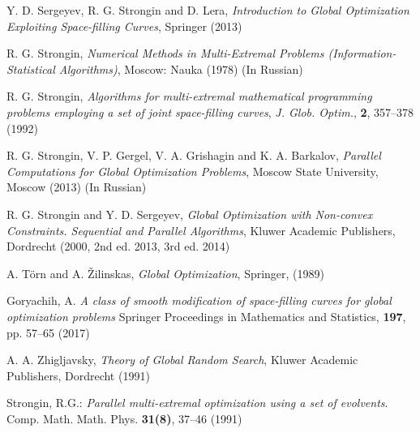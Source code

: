 \documentclass[runningheads]{llncs}
\begin{document}
%
%
% 
% 
%
\begin{thebibliography}{107}

\newblock Y. D. Sergeyev, R. G. Strongin and D. Lera,
\newblock \emph{Introduction to Global Optimization Exploiting Space-filling Curves},
\newblock Springer (2013)

\newblock R. G. Strongin,
\newblock \emph{Numerical Methods in Multi-Extremal Problems (Information-Statistical Algorithms)},
\newblock Moscow: Nauka (1978) (In Russian)

\newblock R. G. Strongin,
\newblock \emph{\emph{Algorithms for multi-extremal mathematical programming problems
employing a set of joint space-filling curves}},
\newblock \emph{J. Glob. Optim.}, \textbf{2}, 357--378 (1992)

\newblock R. G. Strongin, V. P. Gergel, V. A. Grishagin and K. A. Barkalov,
\newblock \emph{Parallel Computations for Global Optimization Problems},
\newblock Moscow State University, Moscow (2013) (In Russian)

\newblock R. G. Strongin and Y. D. Sergeyev,
\newblock \emph{Global Optimization with Non-convex Constraints. Sequential and Parallel
Algorithms},
\newblock Kluwer Academic Publishers, Dordrecht (2000, 2nd ed. 2013, 3rd ed. 2014)

\newblock A. T\"orn and A. \v Zilinskas,
\newblock \emph{Global Optimization},
\newblock Springer, (1989)

\newblock Goryachih, A.
\newblock \emph{A class of smooth modification of space-filling curves for global optimization
problems}
\newblock Springer Proceedings in Mathematics and Statistics, \textbf{197}, pp. 57--65 (2017)

\newblock A. A. Zhigljavsky,
\newblock \emph{Theory of Global Random Search},
\newblock Kluwer Academic Publishers, Dordrecht (1991)

Strongin, R.G.: \emph{Parallel multi-extremal optimization using a set of evolvents}. Comp. Math.
Math. Phys. \textbf{31(8)}, 37--46 (1991)


\end{thebibliography}
\end{document}
